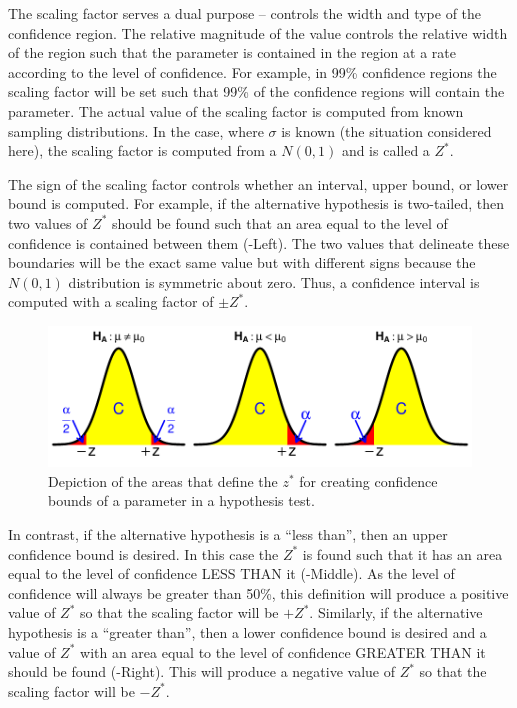 \documentclass[10pt,openany]{book}\usepackage[]{graphicx}\usepackage[]{color}
\newenvironment{knitrout}{}{} %
\begin{document}
The scaling factor serves a dual purpose -- controls the width and type of the confidence region.  The relative magnitude of the value controls the relative width of the region such that the parameter is contained in the region at a rate according to the level of confidence.  For example, in 99\% confidence regions the scaling factor will be set such that 99\% of the confidence regions will contain the parameter.  The actual value of the scaling factor is computed from known sampling distributions.  In the case, where $\sigma$ is known (the situation considered here), the scaling factor is computed from a $N(0,1)$ and is called a $Z^{*}$.

The sign of the scaling factor controls whether an interval, upper bound, or lower bound is computed.  For example, if the alternative hypothesis is two-tailed, then two values of $Z^{*}$ should be found such that an area equal to the level of confidence is contained between them (-Left).  The two values that delineate these boundaries will be the exact same value but with different signs because the $N(0,1)$ distribution is symmetric about zero.  Thus, a confidence interval is computed with a scaling factor of $\pm Z^{*}$.

\begin{knitrout}
\color{fgcolor}\begin{figure}[hbtp]

{\centering \includegraphics[width=.8\linewidth]{Figs/CIboundsZ-1} 

}

\caption[Depiction of the areas that define the $z^{*}$ for creating confidence bounds of a parameter in a hypothesis test]{Depiction of the areas that define the $z^{*}$ for creating confidence bounds of a parameter in a hypothesis test.}\label{fig:CIboundsZ}
\end{figure}


\end{knitrout}

In contrast, if the alternative hypothesis is a ``less than'', then an upper confidence bound is desired.  In this case the $Z^{*}$ is found such that it has an area equal to the level of confidence LESS THAN it (-Middle).  As the level of confidence will always be greater than 50\%, this definition will produce a positive value of $Z^{*}$ so that the scaling factor will be $+Z^{*}$.  Similarly, if the alternative hypothesis is a ``greater than'', then a lower confidence bound is desired and a value of $Z^{*}$ with an area equal to the level of confidence GREATER THAN it should be found (-Right).  This will produce a negative value of $Z^{*}$ so that the scaling factor will be $-Z^{*}$.
\end{document}
